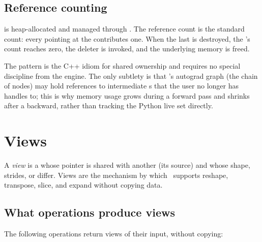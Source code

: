 \subsection{Reference counting}
\label{ssec:tensor_model:refcount}

 is heap-allocated and managed through
. The reference count is the standard
 count: every  pointing at the
 contributes one. When the last  is
destroyed, the 's  count reaches
zero, the deleter is invoked, and the underlying memory is freed.

The pattern is the C++ idiom for shared ownership and requires no
special discipline from the engine. The only subtlety is that
's autograd graph (the chain of 
nodes) may hold references to intermediate s that the
user no longer has handles to; this is why memory usage grows during
a forward pass and shrinks after a backward, rather than tracking
the Python live set directly.

\section{Views}
\label{sec:tensor_model:views}

A \emph{view} is a  whose  pointer
is shared with another  (its source) and whose
shape, strides, or  differ. Views are the
mechanism by which \Lucid\ supports reshape, transpose, slice, and
expand without copying data.

\subsection{What operations produce views}
\label{ssec:tensor_model:view_ops}

The following operations return views of their input, without
copying:

